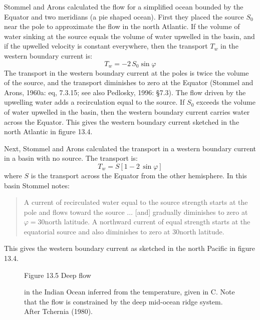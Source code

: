 Stommel and Arons calculated
the flow for a simplified ocean bounded by the Equator and two meridians (a pie
shaped ocean). First they placed the source $S_0$ near the pole to approximate
the flow in the north Atlantic. If the volume of water sinking at the source
equals the volume of water upwelled in the basin, and if the upwelled velocity is
constant everywhere, then the transport $T_w$ in
the western boundary current is:
\begin{equation}
T_w = -2\,S_0 \sin \varphi
\end{equation}
The transport in the western boundary current at the poles is twice the volume of
the source, and the transport diminishes to zero at the Equator (Stommel and
Arons, 1960a: eq, 7.3.15; see also Pedlosky, 1996: \S 7.3). The flow driven by
the upwelling water adds a recirculation equal to the
source. If
$S_0$ exceeds the volume of water upwelled in the basin, then the western boundary current
carries water across the Equator. This gives the western boundary current
sketched in the north Atlantic in figure 13.4.

Next, Stommel and Arons calculated the transport in a western boundary current in a basin with no source. The transport is:
\begin{equation}
T_w = S \left[ 1 - 2 \, \sin \varphi \right]
\end{equation}
where $S$ is the transport across the Equator from the other
hemisphere. In this basin Stommel notes:
\begin{quote} \small
A current of recirculated water equal to the source strength starts at the pole
and flows toward the source $\ldots$ [and] gradually diminishes to zero at
$\varphi = 30$\degrees north latitude. A northward current of equal strength
starts at the equatorial source and also diminishes to zero at 30\degrees north
latitude.
\end{quote}
This gives the western boundary current as sketched in the north Pacific in
figure 13.4.

\begin{figure}[t!]
\centering
{}
\footnotesize
Figure 13.5 Deep flow\rule{0mm}{3ex} in the Indian Ocean inferred from the temperature,
given in \degrees C. Note that the flow is constrained by the deep mid-ocean ridge system.
After Tchernia (1980).
\label{fig:deepindian}
\vspace{-3ex}
\end{figure}

